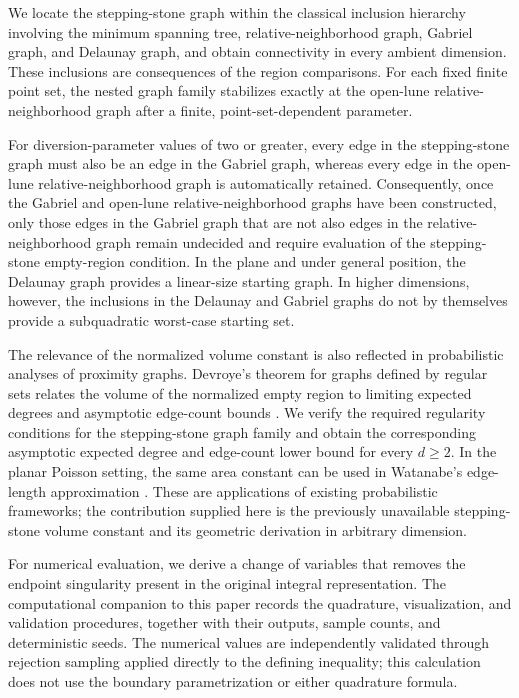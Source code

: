 \documentclass[a4paper,fleqn]{cas-dc}
\theoremstyle{definition}
\theoremstyle{remark}
\newcommand{\0}{\mathbf{0}}
\newcommand{\tb}[1]{\textcolor[HTML]{0000bb}{#1}}
\begin{document}
We
locate the stepping-stone graph within 
the classical inclusion hierarchy involving the
minimum spanning tree, relative-neighborhood graph, Gabriel graph, and
Delaunay graph, and obtain connectivity in every ambient dimension. 
These inclusions are consequences of the region comparisons. 
For each fixed finite
point set, the nested graph family stabilizes exactly at the open-lune
relative-neighborhood graph after a finite, point-set-dependent parameter.



For diversion-parameter values of two or greater, 
every edge in the stepping-stone graph
must also be an edge in the Gabriel graph, 
whereas every edge in the open-lune relative-neighborhood graph
is automatically retained. Consequently, once the Gabriel and open-lune
relative-neighborhood graphs have been constructed, 
only those edges in the Gabriel graph that are not also edges 
in the relative-neighborhood graph remain undecided and require
evaluation of the stepping-stone empty-region condition. In the plane and
under general position, the Delaunay graph provides a linear-size starting
graph. In higher dimensions, however, 
the inclusions in the Delaunay and Gabriel graphs
do not by themselves provide a subquadratic worst-case starting set.

The relevance of the normalized volume constant is also reflected in
probabilistic analyses of proximity graphs.
Devroye's theorem for graphs defined by regular sets
relates the volume of the normalized empty
region to limiting expected degrees and asymptotic edge-count bounds
\citep{devroye1988expected}. We verify the required regularity conditions for
the stepping-stone graph family and obtain the corresponding asymptotic expected
degree and edge-count lower bound for every $d\geq2$.
In the planar Poisson setting, the same area constant can be used in
Watanabe's edge-length approximation
\citep{watanabe2008evaluating}.
These are applications of existing probabilistic frameworks; the
contribution supplied here is the previously unavailable stepping-stone
volume constant and its geometric derivation in arbitrary dimension.

For numerical evaluation, we derive a change of variables that removes the
endpoint singularity present in the original integral representation. 
The computational companion to this paper \citep{espino2026computational} records the quadrature,
visualization, and validation procedures, together with their outputs,
sample counts, and deterministic seeds. The numerical values are
independently validated through rejection sampling applied directly to the
defining inequality; this calculation does not use the boundary
parametrization or either quadrature formula.
\end{document}
